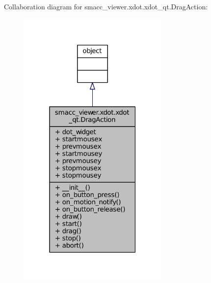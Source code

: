 Collaboration diagram for smacc\+\_\+viewer.\+xdot.\+xdot\+\_\+qt.\+Drag\+Action\+:
\nopagebreak
\begin{figure}[H]
\begin{center}
\leavevmode
\includegraphics[width=211pt]{classsmacc__viewer_1_1xdot_1_1xdot__qt_1_1DragAction__coll__graph}
\end{center}
\end{figure}
